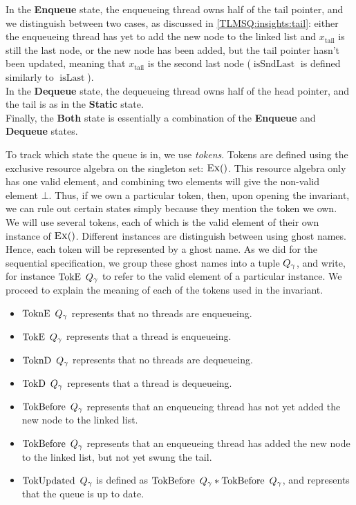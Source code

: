 \documentclass[a4paper, 10pt]{report}
\theoremstyle{definition}
\newcommand{\isLast}{\operatorname{isLast}}
\newcommand{\isSndLast}{\operatorname{isSndLast}}
\newcommand{\node}{x}
\newcommand{\nodeN}[1]{\node_{\mathrm{#1}}}
\newcommand{\nodetail}{\nodeN{tail}}
\newcommand{\StaticState}{\textbf{Static}}
\newcommand{\EnqueueState}{\textbf{Enqueue}}
\newcommand{\DequeueState}{\textbf{Dequeue}}
\newcommand{\BothState}{\textbf{Both}}
\newcommand{\Qg}{Q_\gname}
\newcommand{\TokE}[1]{\operatorname{TokE} ~ #1}
\newcommand{\TokEQg}{\TokE{\Qg}}
\newcommand{\ToknE}[1]{\operatorname{ToknE} ~ #1}
\newcommand{\ToknEQg}{\ToknE{\Qg}}
\newcommand{\TokD}[1]{\operatorname{TokD} ~ #1}
\newcommand{\TokDQg}{\TokD{\Qg}}
\newcommand{\ToknD}[1]{\operatorname{ToknD} ~ #1}
\newcommand{\ToknDQg}{\ToknD{\Qg}}
\newcommand{\TokBefore}[1]{\operatorname{TokBefore} ~ #1}
\newcommand{\TokBeforeQg}{\TokBefore{\Qg}}
\newcommand{\TokAfterQg}{\TokBefore{\Qg}}
\newcommand{\TokUpdated}[1]{\operatorname{TokUpdated} ~ #1}
\newcommand{\TokUpdatedQg}{\TokUpdated{\Qg}}
\begin{document}
In the \EnqueueState{} state, the enqueueing thread owns half of the tail pointer, and we distinguish between two cases, as discussed in \ref{TLMSQ:insights:tail}: either the enqueueing thread has yet to add the new node to the linked list and $\nodetail$ is still the last node, or the new node has been added, but the tail pointer hasn't been updated, meaning that $\nodetail$ is the second last node ($\isSndLast$ is defined similarly to $\isLast$).\\
In the \DequeueState{} state, the dequeueing thread owns half of the head pointer, and the tail is as in the \StaticState{} state.\\
Finally, the \BothState{} state is essentially a combination of the \EnqueueState{} and \DequeueState{} states.

To track which state the queue is in, we use \textit{tokens}. Tokens are defined using the exclusive resource algebra on the singleton set: $\textsc{Ex}{()}$. This resource algebra only has one valid element, and combining two elements will give the non-valid element $\bot$. Thus, if we own a particular token, then, upon opening the invariant, we can rule out certain states simply because they mention the token we own.\\
We will use several tokens, each of which is the valid element of their own instance of $\textsc{Ex}{()}$. Different instances are distinguish between using ghost names. Hence, each token will be represented by a ghost name. As we did for the sequential specification, we group these ghost names into a tuple $\Qg$, and write, for instance $\TokEQg$ to refer to the valid element of a particular instance. We proceed to explain the meaning of each of the tokens used in the invariant.
\begin{itemize}
  \item $\ToknEQg$ represents that no threads are enqueueing.
  \item $\TokEQg$ represents that a thread is enqueueing.
  \item $\ToknDQg$ represents that no threads are dequeueing.
  \item $\TokDQg$ represents that a thread is dequeueing.
  \item $\TokBeforeQg$ represents that an enqueueing thread has not yet added the new node to the linked list.
  \item $\TokAfterQg$ represents that an enqueueing thread has added the new node to the linked list, but not yet swung the tail.
  \item $\TokUpdatedQg$ is defined as $\TokBeforeQg \star \TokAfterQg$, and represents that the queue is up to date.
\end{itemize}
\end{document}
